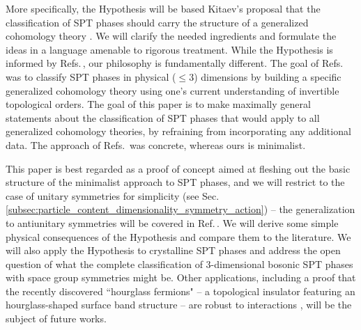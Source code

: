 \documentclass[sort&compress]{elsarticle}
\theoremstyle{theoremstyle}
\theoremstyle{framedtheoremstyle}
\theoremstyle{definitionstyle}
\theoremstyle{definitionstyle}
\theoremstyle{definitionstyle}
\theoremstyle{definitionstyle}
\theoremstyle{nameddefinitionstyle}
\theoremstyle{framednameddefinitionstyle}
\theoremstyle{proofstyle}
\theoremstyle{definitionstyle}
\begin{document}
More specifically, the Hypothesis will be based Kitaev's proposal that the classification of SPT phases should carry the structure of a generalized cohomology theory \cite{Kitaev_Stony_Brook_2011_SRE_1, Kitaev_Stony_Brook_2013_SRE, Kitaev_IPAM}. We will clarify the needed ingredients and formulate the ideas in a language amenable to rigorous treatment. While the Hypothesis is informed by Refs.\,\cite{Kitaev_Stony_Brook_2011_SRE_1, Kitaev_Stony_Brook_2013_SRE, Kitaev_IPAM}, our philosophy is fundamentally different. The goal of Refs.\,\cite{Kitaev_Stony_Brook_2011_SRE_1, Kitaev_Stony_Brook_2013_SRE, Kitaev_IPAM} was to classify SPT phases in physical ($\leq 3$) dimensions by building a specific generalized cohomology theory using one's current understanding of invertible topological orders. The goal of this paper is to make maximally general statements about the classification of SPT phases that would apply to all generalized cohomology theories, by refraining from incorporating any additional data. The approach of Refs.\,\cite{Kitaev_Stony_Brook_2011_SRE_1, Kitaev_Stony_Brook_2013_SRE, Kitaev_IPAM} was concrete, whereas ours is minimalist.

This paper is best regarded as a proof of concept aimed at fleshing out the basic structure of the minimalist approach to SPT phases, and we will restrict to the case of unitary symmetries for simplicity (see Sec.\,\ref{subsec:particle_content_dimensionality_symmetry_action}) -- the generalization to antiunitary symmetries will be covered in Ref.\,\cite{Xiong_Alexandradinata}. We will derive some simple physical consequences of the Hypothesis and compare them to the literature. We will also apply the Hypothesis to crystalline SPT phases and address the open question of what the complete classification of 3-dimensional bosonic SPT phases with space group symmetries might be. Other applications, including a proof that the recently discovered ``hourglass fermions" \cite{Nonsymm_Shiozaki, Hourglass, Cohomological, Ma_discoverhourglass} -- a topological insulator featuring an hourglass-shaped surface band structure -- are robust to interactions \cite{Xiong_Alexandradinata}, will be the subject of future works.
\end{document}
